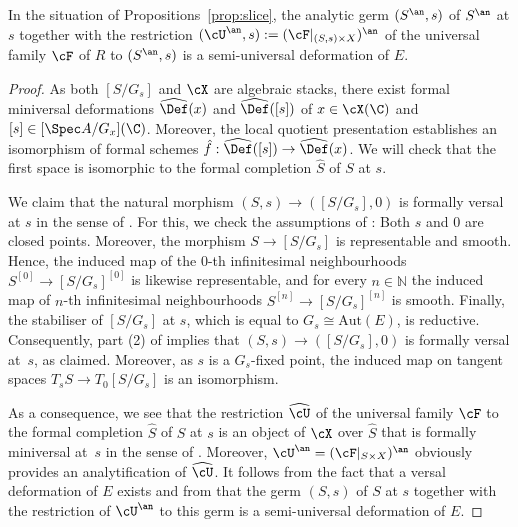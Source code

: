 \begin{Prop}\label{prop:slice-deformation}
In the situation of Propositions~\ref{prop:slice}, the analytic germ $(S^{\an}, s)$ of $S^{\an}$ at $s$ together with the restriction $(\cU^{\an}, s) := (\cF|_{(S,s) \times X})^{\an}$ of the universal family $\cF$ of $R$ to $(S^{\an}, s)$ is a semi-universal deformation of $E$.
\end{Prop}
\begin{proof}
As both $[S/G_s]$ and $\cX$ are algebraic stacks, there exist formal miniversal deformations $\widehat{\Def}(x)$ and $\widehat{\Def}([s])$ of $x\in \cX(\C)$ and $[s] \in [\Spec A/G_x](\C)$. Moreover, the local quotient presentation establishes an isomorphism of formal schemes $\hat{f}:\widehat{\Def}([s]) \to \widehat{\Def}(x)$. We will check that the first space is isomorphic to the formal completion $\widehat S$ of $S$ at $s$.

We claim that the natural morphism $(S, s)\to ([S/G_s], 0)$ is formally versal at $s$ in the sense of \cite[Def.\,A.8]{AlperHR}. For this, we check the assumptions of \cite[Prop.\,A.9]{AlperHR}: Both $s$ and $0$ are closed points. Moreover, the morphism $S \to [S/G_s]$ is representable and smooth. Hence, the induced map of the $0$-th infinitesimal neighbourhoods $S^{[0]} \to [S/G_s]^{[0]}$ is likewise representable, and for every $n \in \mathbb{N}$ the induced map of $n$-th infinitesimal neighbourhoods $S^{[n]} \to [S/G_s]^{[n]}$ is smooth. Finally, the stabiliser of $[S/G_s]$ at $s$, which is equal to $G_s \cong \mathrm{Aut}(E)$, is reductive. Consequently, part (2) of \cite[Prop.\,A.9]{AlperHR} implies that $(S, s)\to ([S/G_s], 0)$ is formally versal at~$s$, as claimed. Moreover, as $s$ is a $G_s$-fixed point, the induced map on tangent spaces $T_s S \to T_0 [S/G_s]$ is an isomorphism.

As a consequence, we see that the restriction $\widehat{\cU}$ of the universal family $\cF$ to the formal completion $\widehat S$ of $S$ at $s$ is an object of $\cX$ over $\widehat S$ that is formally miniversal at~$s$ in the sense of \cite[Def.\,2.8]{Alper}. Moreover, $\cU^{\an} = (\cF|_{S \times X})^{\an}$ obviously provides an analytification of $\widehat{\cU}$. It follows from the fact that a versal deformation of $E$ exists and from \cite[Satz 8.2]{FlennerHabil} that the germ $(S,s)$ of $S$ at $s$ together with the restriction of $\cU^{\an}$ to this germ is a semi-universal deformation of $E$.
\end{proof}

